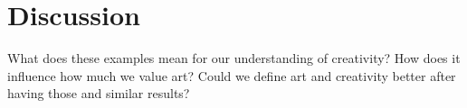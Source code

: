 
\section{Discussion}
\label{sec:discussion}

What does these examples mean for our understanding of creativity? How does it
influence how much we value art? Could we define art and creativity better
after having those and similar results?
